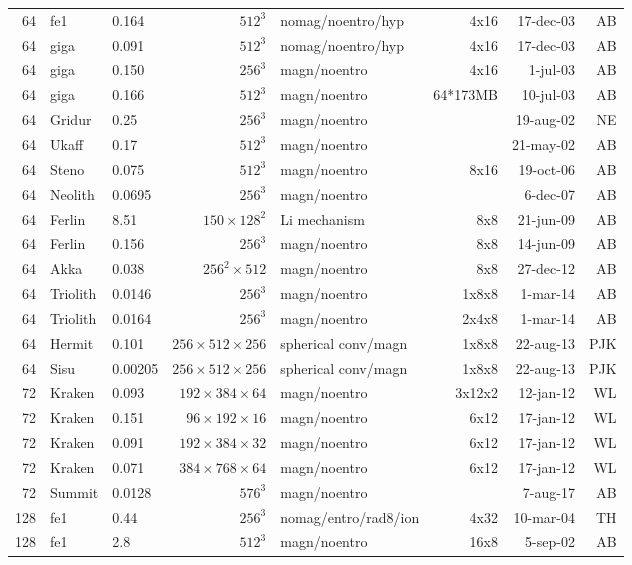 \documentclass[\mydriver,12pt,twoside,notitlepage,a4paper]{article}
\begin{document}
\begin{center}
\begin{footnotesize}
\begin{longtable}{rllrlrrr}
  64 & fe1   & 0.164& $512^3$ &nomag/noentro/hyp&4x16&17-dec-03& AB \\
  64 & giga  & 0.091& $512^3$ &nomag/noentro/hyp&4x16&17-dec-03& AB \\
  64 & giga  & 0.150& $256^3$ & magn/noentro &  4x16  &  1-jul-03 & AB \\
  64 & giga  & 0.166& $512^3$ & magn/noentro &64*173MB& 10-jul-03 & AB \\
  64 & Gridur& 0.25 & $256^3$ & magn/noentro &        & 19-aug-02 & NE \\
  64 & Ukaff & 0.17 & $512^3$ & magn/noentro &        & 21-may-02 & AB \\
  64 & Steno & 0.075& $512^3$ & magn/noentro &  8x16  & 19-oct-06 & AB \\
  64 &Neolith&0.0695& $256^3$ & magn/noentro &        &  6-dec-07 & AB \\
  64 &Ferlin & 8.51&$150{\!\times\!}128^2$&Li mechanism& 8x8& 21-jun-09 & AB \\
  64 &Ferlin & 0.156& $256^3$ & magn/noentro &  8x8   & 14-jun-09 & AB \\
  64 & Akka  & 0.038&$256^2{\!\times\!}512$& magn/noentro & 8x8 & 27-dec-12 & AB \\
  64 &Triolith&0.0146&$256^3$ & magn/noentro & 1x8x8  &  1-mar-14 & AB \\
  64 &Triolith&0.0164&$256^3$ & magn/noentro & 2x4x8  &  1-mar-14 & AB \\
  64 &Hermit&0.101&$256{\!\times\!}512{\!\times\!}256$&spherical conv/magn&1x8x8&22-aug-13&PJK\\
  64 & Sisu  & 0.00205&$256{\!\times\!}512{\!\times\!}256$&spherical conv/magn&1x8x8&22-aug-13&PJK\\
  72 &Kraken&0.093&$192{\!\times\!}384{\!\times\!}64$&magn/noentro&3x12x2&12-jan-12&WL\\
  72 & Kraken& 0.151  &$96{\!\times\!}192{\!\times\!}16$ &magn/noentro & 6x12 &17-jan-12 & WL\\
  72 & Kraken& 0.091  &$192{\!\times\!}384{\!\times\!}32$ & magn/noentro & 6x12 &17-jan-12 & WL\\
  72 & Kraken& 0.071  &$384{\!\times\!}768{\!\times\!}64$ & magn/noentro & 6x12 &17-jan-12 & WL\\
  72 &Summit &0.0128& $576^3$ & magn/noentro &        &  7-aug-17 & AB \\
 128 & fe1   & 0.44 & $256^3$ &nomag/entro/rad8/ion&4x32&10-mar-04& TH \\
 128 & fe1   & 2.8  & $512^3$ & magn/noentro & 16x8   &  5-sep-02 & AB \\

\end{longtable}
\end{footnotesize}
\end{center}
\end{document}
